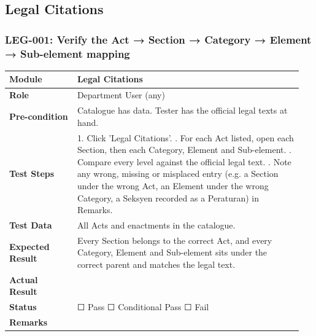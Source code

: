 \documentclass[10pt]{article}
\begin{document}
\subsection{Legal Citations}
\subsubsection*{LEG-001: Verify the Act → Section → Category → Element → Sub-element mapping}
\begin{longtable}{p{0.22\linewidth}p{0.73\linewidth}}
\hline
\textbf{Module} & Legal Citations \\ \hline
\textbf{Role} & Department User (any) \\ \hline
\textbf{Pre-condition} & Catalogue has data. Tester has the official legal texts at hand. \\ \hline
\textbf{Test Steps} & 1. Click 'Legal Citations'. \newline 2. For each Act listed, open each Section, then each Category, Element and Sub-element. \newline 3. Compare every level against the official legal text. \newline 4. Note any wrong, missing or misplaced entry (e.g. a Section under the wrong Act, an Element under the wrong Category, a Seksyen recorded as a Peraturan) in Remarks. \\ \hline
\textbf{Test Data} & All Acts and enactments in the catalogue. \\ \hline
\textbf{Expected Result} & Every Section belongs to the correct Act, and every Category, Element and Sub-element sits under the correct parent and matches the legal text. \\ \hline
\textbf{Actual Result} & \newline \newline \\ \hline
\textbf{Status} & ☐ Pass \quad ☐ Conditional Pass \quad ☐ Fail \\ \hline
\textbf{Remarks} & \newline \\ \hline
\end{longtable}
\end{document}
